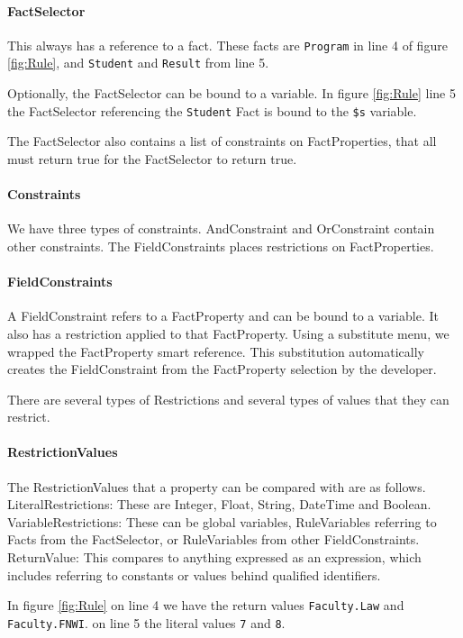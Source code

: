 \paragraph{FactSelector} This always has a reference to a fact.
These facts are \texttt{Program} in line 4 of figure \ref{fig:Rule}, and \texttt{Student} and \texttt{Result} from line 5.

Optionally, the FactSelector can be bound to a variable.
In figure \ref{fig:Rule} line 5 the FactSelector referencing the \texttt{Student} Fact is bound to the \texttt{\$s} variable.

The FactSelector also contains a list of constraints on FactProperties, that all must return true for the FactSelector to return true.

\paragraph{Constraints} We have three types of constraints.
AndConstraint and OrConstraint contain other constraints.
The FieldConstraints places restrictions on FactProperties.

\paragraph{FieldConstraints} A FieldConstraint refers to a FactProperty and can be bound to a variable.
It also has a restriction applied to that FactProperty.
Using a substitute menu, we wrapped the FactProperty smart reference.
This substitution automatically creates the FieldConstraint from the FactProperty selection by the developer.

There are several types of Restrictions and several types of values that they can restrict.

\paragraph{RestrictionValues} The RestrictionValues that a property can be compared with are as follows.
LiteralRestrictions: These are Integer, Float, String, DateTime and Boolean.
VariableRestrictions: These can be global variables, RuleVariables referring to Facts from the FactSelector, or RuleVariables from other FieldConstraints.
ReturnValue: This compares to anything expressed as an expression, which includes referring to constants or values behind qualified identifiers.

In figure \ref{fig:Rule} on line 4 we have the return values \texttt{Faculty.Law} and \texttt{Faculty.FNWI}.
on line 5 the literal values \texttt{7} and \texttt{8}.

